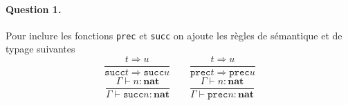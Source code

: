\documentclass{article}
\title{\titre}
\date{}
\author{\auteur}
\newcommand{\titreCourt}{DM -- Mini-ML}
\newcommand{\auteur}{Marius \textsc{Dufraisse}}
\newcommand{\sem}{\Rightarrow}
\theoremstyle{thm}
\theoremstyle{def}
\theoremstyle{dem}
\newcommand{\code}[1]{\texttt{#1}}
\newcommand{\codem}[1]{\mathtt{#1}}
\newcommand{\types}[1]{\mathbf{#1}}
\begin{document}
	\renewcommand{\labelitemi}{\textbullet}



	\maketitle
	\paragraph{Question 1.}
	Pour inclure les fonctions \code{prec} et \code{succ} on ajoute les règles de sémantique et de typage suivantes
	\[ \frac{t \sem u}{\codem{succ}t\sem\codem{succ}{u}}\qquad \frac{t \sem u}{\codem{prec}t\sem\codem{prec}{u}} \]
	\[\frac{\Gamma\vdash  n : \types{nat}}{\Gamma\vdash \codem{succ}n:\types{nat}} \qquad\frac{\Gamma\vdash  n : \types{nat}}{\Gamma\vdash \codem{prec}n:\types{nat}}\]
\end{document}
